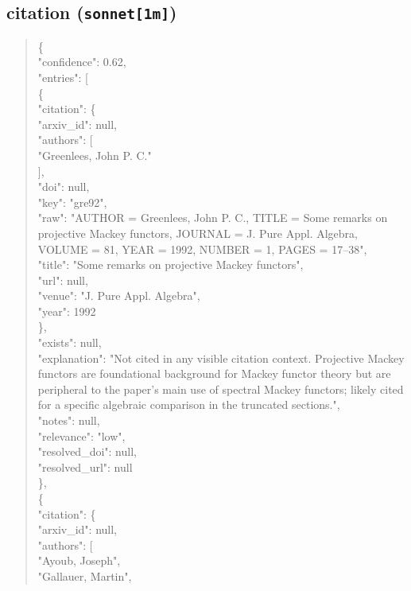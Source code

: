 \documentclass[11pt]{article}
\begin{document}
\subsection*{citation (\texttt{sonnet[1m]})}
\begin{quote}\small\ttfamily\raggedright
\{\\
  "confidence": 0.62,\\
  "entries": [\\
    \{\\
      "citation": \{\\
        "arxiv\_id": null,\\
        "authors": [\\
          "Greenlees, John P. C."\\
        ],\\
        "doi": null,\\
        "key": "gre92",\\
        "raw": "AUTHOR = Greenlees, John P. C., TITLE = Some remarks on projective Mackey functors, JOURNAL = J. Pure Appl. Algebra, VOLUME = 81, YEAR = 1992, NUMBER = 1, PAGES = 17--38",\\
        "title": "Some remarks on projective Mackey functors",\\
        "url": null,\\
        "venue": "J. Pure Appl. Algebra",\\
        "year": 1992\\
      \},\\
      "exists": null,\\
      "explanation": "Not cited in any visible citation context. Projective Mackey functors are foundational background for Mackey functor theory but are peripheral to the paper's main use of spectral Mackey functors; likely cited for a specific algebraic comparison in the truncated sections.",\\
      "notes": null,\\
      "relevance": "low",\\
      "resolved\_doi": null,\\
      "resolved\_url": null\\
    \},\\
    \{\\
      "citation": \{\\
        "arxiv\_id": null,\\
        "authors": [\\
          "Ayoub, Joseph",\\
          "Gallauer, Martin",\\

\end{quote}
\end{document}
